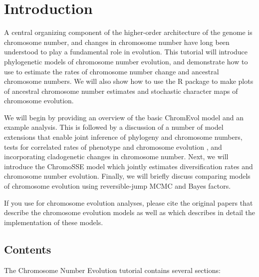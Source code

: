 \section*{Introduction}

A central organizing component of the higher-order architecture of the
genome is chromosome number, and changes in chromosome number have long
been understood to play a fundamental role in evolution.
This tutorial will introduce phylogenetic models of chromosome number evolution,
and demonstrate how to use \RevBayes 
to estimate the rates of chromosome number change and ancestral chromosome numbers.
We will also show how to use the \RevGadgets R package to make plots of ancestral
chromosome number estimates and stochastic character maps of chromosome evolution.

We will begin by providing an overview of the basic ChromEvol model \citep{mayrose2010probabilistic} and 
an example \RevBayes analysis. 
This is followed by a discussion of a number of model extensions 
that enable joint inference of phylogeny
and chromosome numbers, 
tests for correlated rates of phenotype and chromosome evolution \citep[the BiChroM model;][]{zenil2017testing},
and incorporating cladogenetic changes in chromosome number.
Next, we will introduce the ChromoSSE model \citep{freyman2016cladogenetic} which jointly
estimates diversification rates and chromosome number evolution.
Finally, we will briefly discuss comparing models of chromosome evolution using
reversible-jump MCMC and Bayes factors.

If you use \RevBayes for chromosome evolution analyses, please cite the original 
papers that describe the chromosome evolution models as well as \citet{freyman2016cladogenetic}
which describes in detail the \RevBayes implementation of these models.

\subsection*{Contents}

The Chromosome Number Evolution tutorial contains several sections:

